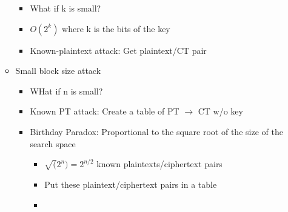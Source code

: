 \begin{itemize}
\begin{itemize}
        \begin{itemize}
        \item What if k is small?
        \item $O(2^k)$ where k is the bits of the key
        \item Known-plaintext attack: Get plaintext/CT pair
        \end{itemize}
    \item Small block size attack
        \begin{itemize}
        \item WHat if n is small?
        \item Known PT attack: Create a table of PT $\rightarrow$ CT w/o key
        \item Birthday Paradox: Proportional to the square root of the size of the search space
            \begin{itemize}
            \item $\sqrt(2^n) = 2^{n/2}$ known plaintexts/ciphertext pairs
            \item Put these plaintext/ciphertext pairs in a table
            \item 
            \end{itemize}
        \end{itemize}
    \end{itemize}
\end{itemize}